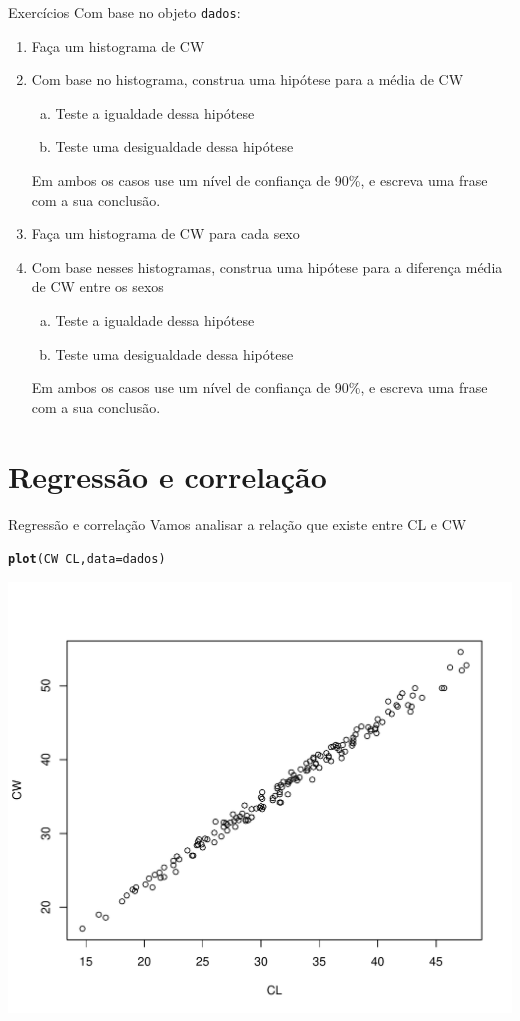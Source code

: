 \documentclass[10pt]{beamer}\usepackage[]{graphicx}\usepackage[]{color}
\makeatletter
\newcommand{\hlopt}[1]{\textcolor[rgb]{0,0,0}{#1}}%
\newcommand{\hlstd}[1]{\textcolor[rgb]{0.345,0.345,0.345}{#1}}%
\newcommand{\hlkwc}[1]{\textcolor[rgb]{0.333,0.667,0.333}{#1}}%
\newcommand{\hlkwd}[1]{\textcolor[rgb]{0.737,0.353,0.396}{\textbf{#1}}}%
\newenvironment{kframe}{%
 \def\at@end@of@kframe{}%
 \ifinner\ifhmode%
  \def\at@end@of@kframe{\end{minipage}}%
  \begin{minipage}{\columnwidth}%
 \fi\fi%
 \def\FrameCommand##1{\hskip\@totalleftmargin \hskip-\fboxsep
 \colorbox{shadecolor}{##1}\hskip-\fboxsep
     \hskip-\linewidth \hskip-\@totalleftmargin \hskip\columnwidth}%
 \MakeFramed {\advance\hsize-\width
   \@totalleftmargin\z@ \linewidth\hsize
   \@setminipage}}%
 {\par\unskip\endMakeFramed%
 \at@end@of@kframe}
\newenvironment{knitrout}{}{} %
\theoremstyle{definition}
\makeatother
\begin{document}
\begin{frame}[fragile]{Exercícios}
Com base no objeto \texttt{dados}:
  \begin{enumerate}[(1)]
  \item Faça um histograma de CW
  \item Com base no histograma, construa uma hipótese para a média de CW
    \begin{enumerate}[(a)]
    \item Teste a igualdade dessa hipótese
    \item Teste uma desigualdade dessa hipótese
    \end{enumerate}
    Em ambos os casos use um nível de confiança de 90\%, e escreva uma
    frase com a sua conclusão.
  \item Faça um histograma de CW para cada sexo
  \item Com base nesses histogramas, construa uma hipótese para a
    diferença média de CW entre os sexos
    \begin{enumerate}[(a)]
    \item Teste a igualdade dessa hipótese
    \item Teste uma desigualdade dessa hipótese
    \end{enumerate}
    Em ambos os casos use um nível de confiança de 90\%, e escreva uma
    frase com a sua conclusão.
  \end{enumerate}
\end{frame}

\section{Regressão e correlação}

\begin{frame}[fragile]{Regressão e correlação}
Vamos analisar a relação que existe entre CL e CW
\begin{knitrout}\footnotesize
{}\color{fgcolor}\begin{kframe}
\begin{alltt}
\hlkwd{plot}\hlstd{(CW} \hlopt{~} \hlstd{CL,} \hlkwc{data} \hlstd{= dados)}
\end{alltt}
\end{kframe}

{\centering \includegraphics[width=.6\textwidth]{figure/unnamed-chunk-9-1} 

}



\end{knitrout}
\end{frame}
\end{document}
